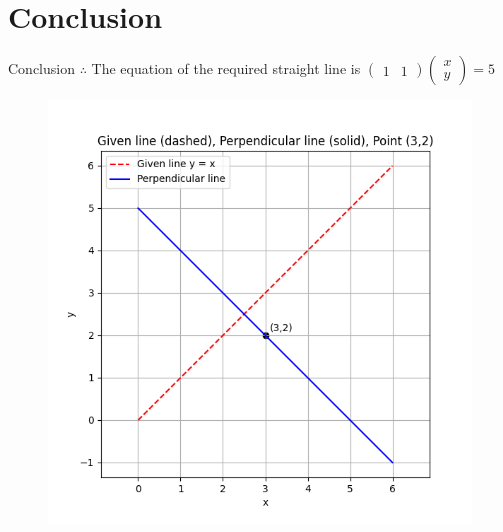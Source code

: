 \documentclass{beamer}
\theoremstyle{remark}
\newcommand{\myvec}[1]{\ensuremath{\begin{pmatrix}#1\end{pmatrix}}}
\begin{document}
\section{Conclusion}
\begin{frame}{Conclusion}
 $\therefore$ The equation of the required straight line is $\myvec{1&1}\myvec{x\\y}=5$

 \begin{figure}
     \centering
     \includegraphics[width=0.5\columnwidth]{figs/2.png}
     \caption{}
     \label{fig:placeholder}
 \end{figure}
\end{frame}
\end{document}
